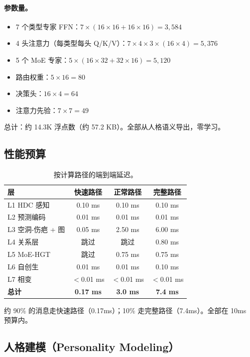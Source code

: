 \documentclass[11pt]{article}
\begin{document}
\paragraph{参数量。}
\begin{itemize}
\item 7 个类型专家 FFN：$7 \times (16 \times 16 + 16 \times 16) = 3{,}584$
\item 4 头注意力（每类型每头 Q/K/V）：$7 \times 4 \times 3 \times (16 \times 4) = 5{,}376$
\item 5 个 MoE 专家：$5 \times (16 \times 32 + 32 \times 16) = 5{,}120$
\item 路由权重：$5 \times 16 = 80$
\item 决策头：$16 \times 4 = 64$
\item 注意力先验：$7 \times 7 = 49$
\end{itemize}
总计：约 14.3K 浮点数（约 57.2 KB）。全部从人格语义导出，零学习。

\subsection{性能预算}

\begin{table}[h]
\centering
\caption{按计算路径的端到端延迟。}
\label{tab:perf}
\begin{tabular}{lccc}
\toprule
层 & 快速路径 & 正常路径 & 完整路径 \\
\midrule
L1 HDC 感知 & 0.10 ms & 0.10 ms & 0.10 ms \\
L2 预测编码 & 0.01 ms & 0.01 ms & 0.01 ms \\
L3 空洞-伤疤 + 图 & 0.05 ms & 2.50 ms & 6.00 ms \\
L4 关系层 & 跳过 & 跳过 & 0.80 ms \\
L5 MoE-HGT & 跳过 & 0.75 ms & 0.75 ms \\
L6 自创生 & 0.01 ms & 0.01 ms & 0.10 ms \\
L7 相变 & $<$0.01 ms & $<$0.01 ms & $<$0.01 ms \\
\midrule
\textbf{总计} & \textbf{0.17 ms} & \textbf{3.0 ms} & \textbf{7.4 ms} \\
\bottomrule
\end{tabular}
\end{table}

约 90\% 的消息走快速路径（0.17ms）；10\% 走完整路径（7.4ms）。全部在 10ms 预算内。

\subsection{人格建模（Personality Modeling）}
\label{subsec:personality-modeling}
\end{document}
